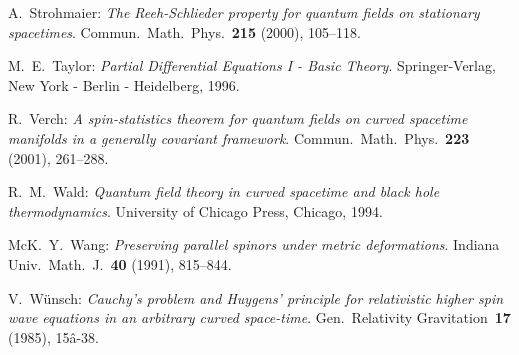 \documentclass[a4paper,11pt]{amsart}
\theoremstyle{definition}
\begin{document}
\begin{thebibliography}{11}
{\sc A.~Strohmaier:}
{\em The Reeh-Schlieder property for quantum fields on stationary spacetimes}.
Commun.\ Math.\ Phys.~{\bf 215} (2000), 105--118. 

{\sc M.~E.~Taylor:}
{\em Partial Differential Equations I - Basic Theory}.
Springer-Verlag, New York - Berlin - Heidelberg, 1996.

{\sc R.~Verch:}
{\em A spin-statistics theorem for quantum fields on curved spacetime manifolds in a generally covariant framework}.
Commun.\ Math.\ Phys.~{\bf 223} (2001), 261--288.

{\sc R.~M.~Wald:}
{\em Quantum field theory in curved spacetime and black hole thermodynamics}. 
University of Chicago Press, Chicago, 1994.

{\sc McK.~Y.~Wang:} 
{\em Preserving parallel spinors under metric deformations}.  
Indiana Univ.\ Math.\ J.~\textbf{40} (1991), 815--844.

{\sc V.~W\"unsch:}
{\em Cauchy's problem and Huygens' principle for relativistic higher spin wave equations in an arbitrary curved space-time}.
Gen.\ Relativity Gravitation~\textbf{17} (1985), 15â-38. 
\end{thebibliography}
\end{document}
